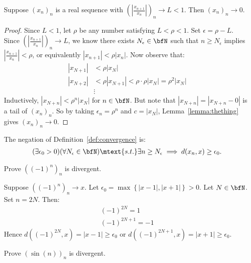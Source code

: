     \begin{proposition}
        Suppose $(x_n)_n$ is a real sequence with $\left(\left|\frac{x_{n+1}}{x_n}\right|\right)_n \rightarrow L < 1$. Then $(x_n)_n \rightarrow 0$.
    \end{proposition}
        \begin{proof}
            Since $L<1$, let $\rho$ be any number satisfying $L < \rho < 1$. Set $\epsilon = \rho - L$. Since $\left(\left|\frac{x_{n+1}}{x_n}\right|\right)_n \rightarrow L$, we know there exists $N_\epsilon \in \bfN$ such that $n \geq N_\epsilon$ implies $\left|\frac{x_{n+1}}{x_n}\right| < \rho$, or equivalently $|x_{n+1}| < \rho|x_n|$. Now observe that:
                \begin{equation*}
                \begin{split}
                    |x_{N+1}| &< \rho|x_N| \\
                    |x_{N+2}| &< \rho|x_{N+1}| < \rho \cdot \rho |x_N| = \rho^2 |x_N|\\
                    &\vdots
                \end{split}
                \end{equation*}
            Inductively, $|x_{N+n}| < \rho^n|x_N|$ for $n \in \bfN$. But note that $|x_{N+n}| = |x_{N+n} - 0|$ is a tail of $(x_n)_n$. So by taking $\epsilon_n = \rho^n$ and $c = |x_N|$, Lemma~\ref{lemma:thething} gives $(x_n)_n \rightarrow 0$.
        \end{proof}

    \begin{note}
        The negation of Definition~\ref{def:convergence} is:
            \begin{equation*}
            \begin{split}
                (\exists \epsilon_0 > 0)(\forall N_\epsilon \in \bfN) \mtext{s.t.} \exists n \geq N_\epsilon \implies d(x_n,x) \geq \epsilon_0.
            \end{split}
            \end{equation*}
    \end{note}

    \begin{example}
        Prove $((-1)^n)_n$ is divergent.
    \end{example}
        \begin{solution}
            Suppose $((-1)^n)_n \rightarrow x$. Let $\epsilon_0 = \max \left\{|x-1|,|x+1|\right\} > 0$. Let $N \in \bfN$. Set $n = 2N$. Then:
                \begin{equation*}
                \begin{split}
                    (-1)^{2N} = 1 \\
                    (-1)^{2N+1} = -1
                \end{split}
                \end{equation*}
            Hence $d((-1)^{2N},x) = |x-1| \geq \epsilon_0$ or $d((-1)^{2N+1},x) = |x+1| \geq \epsilon_0$.
        \end{solution}

    \begin{exercise}
        Prove $(\sin(n))_n$ is divergent.
    \end{exercise}
